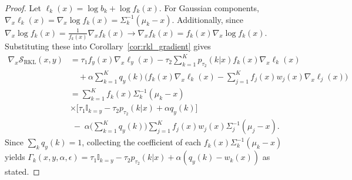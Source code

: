 \documentclass[10pt,a4paper]{amsart}
\begin{document}
\begin{proof}
Let $\ell_k(x)=\log b_k+\log f_k(x)$. For Gaussian components, $
\nabla_x \ell_k(x)=\nabla_x \log f_k(x)=\Sigma_k^{-1}(\mu_k-x)$. Additionally, since $\nabla_x \log f_k(x) = \frac{1}{f_k(x)} \nabla_x f_k(x) \rightarrow \nabla_x f_k(x) = f_k(x) \nabla_x \log f_k(x) $. Substituting these into Corollary~\ref{cor:rkl_gradient} gives
{\fontsize{8.5}{10}\selectfont
\begin{equation}
\begin{aligned}
\nabla_x \mathcal{S}_{\text{RKL}}(x, y)
&= \tau_1 f_y(x) \nabla_x \ell_y(x) - \tau_2 \sum_{k=1}^K p_{\tau_2}(k|x) f_k(x) \nabla_x \ell_k(x) \\
&\quad + \alpha \sum_{k=1}^K q_y(k) \Big(  f_k(x) \nabla_x \ell_k(x) - \sum_{j=1}^K  f_j(x)  w_j(x)\nabla_x \ell_j(x)\Big) \\
&= \sum_{k=1}^K  f_k(x) \Sigma_k^{-1}(\mu_k-x)\\ &\times\Big[\tau_1\mathbb{I}_{k=y}-\tau_2 p_{\tau_2}(k|x)+\alpha q_y(k)\Big] \\ &
     \;-\;\alpha\Big(\sum_{k=1}^K q_y(k)\Big)\sum_{j=1}^K f_j(x) w_j(x)\Sigma_j^{-1}(\mu_j-x).
\end{aligned}
\end{equation}}
Since $\sum_k q_y(k)=1$, collecting the coefficient of each $ f_k(x) \Sigma_k^{-1}(\mu_k-x)$ yields
$\Gamma_k(x,y,\alpha,\epsilon)=\tau_1\mathbb{I}_{k=y}-\tau_2 p_{\tau_2}(k|x)+\alpha(q_y(k)-w_k(x))$ as stated.
\end{proof}
\end{document}
